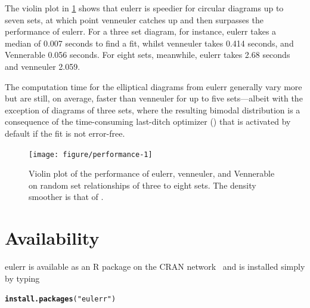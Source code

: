 \documentclass[
  oneside,
  openany,
  numbers=noendperiod,
  parskip=half,
  bibliography=totoc
]{scrbook}\usepackage[]{graphicx}\usepackage{xcolor}
\makeatletter
\newcommand{\hlstr}[1]{\textcolor[rgb]{0.192,0.494,0.8}{#1}}%
\newcommand{\hlstd}[1]{\textcolor[rgb]{0.345,0.345,0.345}{#1}}%
\newcommand{\hlkwd}[1]{\textcolor[rgb]{0.737,0.353,0.396}{\textbf{#1}}}%
\newenvironment{kframe}{%
 \def\at@end@of@kframe{}%
 \ifinner\ifhmode%
  \def\at@end@of@kframe{\end{minipage}}%
  \begin{minipage}{\columnwidth}%
 \fi\fi%
 \def\FrameCommand##1{\hskip\@totalleftmargin \hskip-\fboxsep
 \colorbox{shadecolor}{##1}\hskip-\fboxsep
     \hskip-\linewidth \hskip-\@totalleftmargin \hskip\columnwidth}%
 \MakeFramed {\advance\hsize-\width
   \@totalleftmargin\z@ \linewidth\hsize
   \@setminipage}}%
 {\par\unskip\endMakeFramed%
 \at@end@of@kframe}
\newenvironment{knitrout}{}{} %
\newcommand{\pkg}[1]{{\fontseries{b}\selectfont #1}}
\makeatother
\begin{document}
The violin plot in \cref{fig:performance} shows that \pkg{eulerr} is speedier
for circular diagrams up to seven sets, at which point \pkg{venneuler} catches
up and then surpasses the performance of \pkg{eulerr}. For a three set diagram,
for instance, \pkg{eulerr} takes a median of
0.007
seconds to find a fit, whilst \pkg{venneuler} takes 0.414
seconds, and \pkg{Vennerable} 0.056
seconds. For eight sets, meanwhile, \pkg{eulerr} takes
2.68
seconds and \pkg{venneuler} 2.059.

The computation time for the elliptical
diagrams from \pkg{eulerr} generally vary more but are still, on average,
faster than \pkg{venneuler} for up to five sets---albeit with the exception
of diagrams of three sets, where the resulting bimodal distribution is a
consequence of the time-consuming
last-ditch optimizer () that is activated by default
if the fit is not error-free.

\begin{figure}[hbtp]
\begin{knitrout}\small
{}\color{fgcolor}

{\centering \texttt{[image: figure/performance-1]} 

}



\end{knitrout}
\caption{Violin plot of the performance of \pkg{eulerr}, \pkg{venneuler}, and \pkg{Vennerable} on
random set relationships of three to eight sets. The density smoother is that of \citet{Sheather_1991}.}
\label{fig:performance}
\end{figure}

\section{Availability}\label{sec:availability}

\pkg{eulerr} is available as an R package on the CRAN network~\citep{RCT_2017a}
and is installed simply by typing

\begin{knitrout}\small
{}\color{fgcolor}\begin{kframe}
\begin{alltt}
\hlkwd{install.packages}\hlstd{(}\hlstr{"eulerr"}\hlstd{)}
\end{alltt}
\end{kframe}
\end{knitrout}
\end{document}
